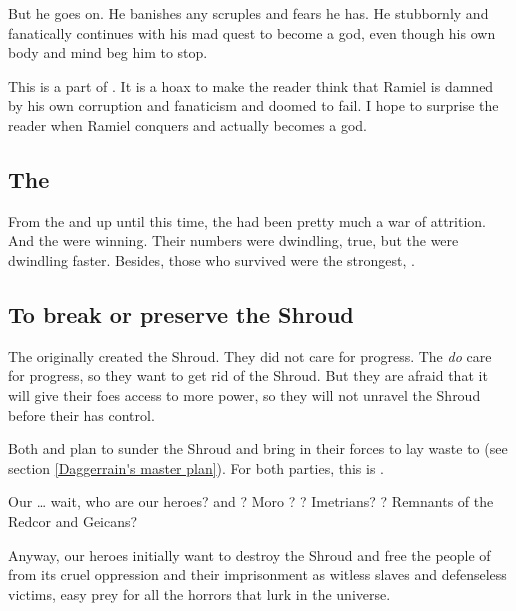 But he goes on. 
He banishes any scruples and fears he has. 
He stubbornly and fanatically continues with his mad quest to become a god, even though his own body and mind beg him to stop. 

This is a part of . 
It is a hoax to make the reader think that Ramiel is damned by his own corruption and fanaticism and doomed to fail. 
I hope to surprise the reader when Ramiel conquers and actually becomes a god. 







\subsection{The \Feud}
From the \Shrouding{} and up until this time, the \feud{} had been pretty much a war of attrition. 
And the \resphain{} were winning. 
Their numbers were dwindling, true, but the \dragons{} were dwindling faster. 
Besides, those \resphain{} who survived were the strongest, . 







\subsection{To break or preserve the Shroud}
The \dragons{} originally created the Shroud. They did not care for progress. The \resphain{} \emph{do} care for progress, so they want to get rid of the Shroud. But they are afraid that it will give their \draconic{} foes access to more \xsic{} power, so they will not unravel the Shroud before their \matrix{} has control. 

Both \Daggerrain{} and \Secherdamon{} plan to sunder the Shroud and bring in their forces to lay waste to \Miith{} (see section \ref{Daggerrain's master plan}). For both parties, this is .

Our \ldots{} wait, who are our heroes? \Narkiza{} and \Dzasselid? Moro \Cornel? \Cuezcans? Imetrians? \Ophidians? Remnants of the Redcor and Geicans?

Anyway, our heroes initially want to destroy the Shroud and free the people of \Miith{} from its cruel oppression and their imprisonment as witless slaves and defenseless victims, easy prey for all the horrors that lurk in the universe.


